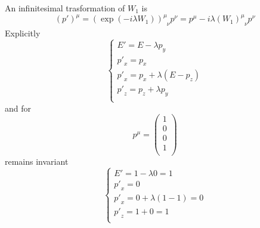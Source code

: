     An infinitesimal trasformation of $W_1$ is 
    \begin{equation*}
        (p')^\mu = (\exp(- i \lambda W_1))^\mu_{\phantom \mu \nu} p^\nu = p^\mu - i \lambda (W_1)^\mu_{\phantom \mu \nu} p^\nu
    \end{equation*}
    Explicitly 
    \begin{equation*}
        \begin{cases}
            E' = E - \lambda p_y \\
            {p'}_x = p_x \\
            {p'}_x = p_x + \lambda (E - p_z) \\
            {p'}_z = p_z + \lambda p_y\\
        \end{cases}
    \end{equation*}
    and for 
    \begin{equation*}
        p^\mu = \begin{pmatrix}
            1 \\ 0 \\ 0 \\ 1 \\
        \end{pmatrix}
    \end{equation*}
    remains invariant 
    \begin{equation*}
    \begin{cases}
        E' = 1 - \lambda 0 = 1\\
        {p'}_x = 0 \\
        {p'}_x = 0 + \lambda (1 - 1) = 0 \\
        {p'}_z = 1 + 0 = 1\\
    \end{cases}
    \end{equation*}
    
    
